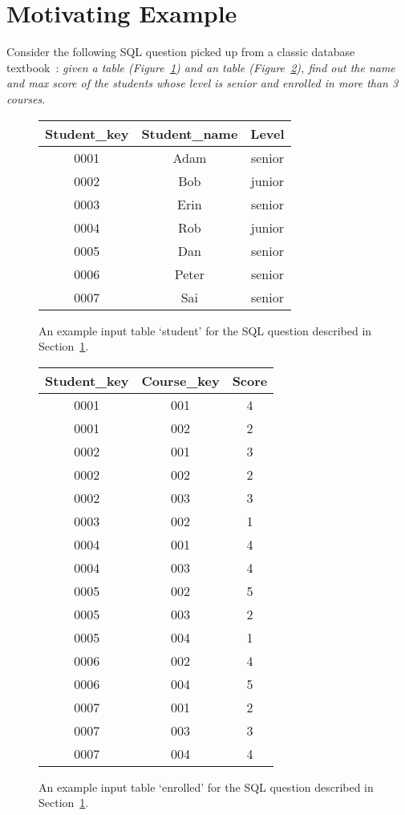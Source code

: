 \section{Motivating Example}
\label{sec:example}

Consider the following SQL question picked up from a classic
database textbook~\cite{cowbook}: \textit{given a  table (Figure~\ref{tbl:student})
and an  table (Figure~\ref{tbl:enrolled}), find out the name and max score of the
students whose level is senior and enrolled in more than 3 courses}.



\begin{figure}[t]
	\centering
\begin{tabular}{|c|c|c|}
\hline
 Student\_key& Student\_name & Level\\
\hline
 0001 & Adam & senior \\
 \hline
 0002 & Bob & junior \\
 \hline
 0003 & Erin & senior \\
 \hline
 0004 & Rob & junior\\
 \hline
 0005 & Dan & senior \\
 \hline
 0006 & Peter & senior \\
 \hline
 0007 & Sai & senior \\
 \hline
\end{tabular}
	\caption{An example input table `student'
for the SQL question described in
Section~\ref{sec:example}.}
	\label{tbl:student}
\end{figure}


\begin{figure}[t]
	\centering
\begin{tabular}{|c|c|c|}
\hline
 Student\_key& Course\_key& Score \\
\hline
 0001 & 001 & 4 \\
\hline
 0001 & 002 & 2 \\
\hline
 0002 & 001 & 3 \\
\hline
 0002 & 002 & 2 \\
\hline
 0002 & 003 & 3 \\
\hline
 0003 & 002 & 1 \\
\hline
 0004 & 001 & 4 \\
\hline
 0004 & 003 & 4 \\
\hline
 0005 & 002 & 5 \\
\hline
 0005 & 003 & 2 \\
\hline
 0005 & 004 & 1 \\
\hline
 0006 & 002 & 4 \\
\hline
 0006 & 004 & 5 \\
\hline
 0007 & 001 & 2 \\
\hline
 0007 & 003 & 3 \\
\hline
 0007 & 004 & 4 \\
 \hline
\end{tabular}
	\caption{An example input table  `enrolled'
for the SQL question described in
Section~\ref{sec:example}.}
	\label{tbl:enrolled}
\end{figure}	

